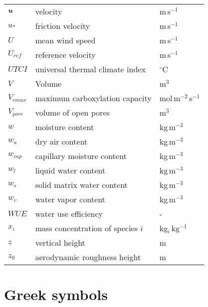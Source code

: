 \begin{longtable}{p{}p{}p{}}
	$\textbf{\textit{u}}$ & velocity & m\,s$^{-1}$ \\ 
	$u_*$ & friction velocity & m\,s$^{-1}$ \\ 
	$U$ & mean wind speed & m\,s$^{-1}$ \\ 
	$U_{\textit{ref}}$ & reference velocity & m\,s$^{-1}$ \\ 	
	$\textit{UTCI}$ & universal thermal climate index & $^{\circ}$C \\ 	

	$V$ & Volume & m$^{3}$ \\ 
	$V_{\textit{cmax}}$ & maximum carboxylation capacity & mol\,m$^{-2}$\,s$^{-1}$ \\ 
	$V_{\textit{pore}}$ & volume of open pores & m$^{3}$ \\ 
	$w$ & moisture content & kg\,m$^{-3}$ \\ 
	$w_a$ & dry air content & kg\,m$^{-3}$ \\ 	

	$w_{\textit{cap}}$ & capillary moisture content & kg\,m$^{-3}$ \\ 
	$w_l$ & liquid water content & kg\,m$^{-3}$ \\ 		
	$w_s$ & solid matrix water content & kg\,m$^{-3}$ \\ 
	$w_v$ & water vapor content & kg\,m$^{-3}$ \\ 		
	$\textit{WUE}$ & water use efficiency & - \\ 			
	$x_i$ & mass concentration of species $i$ & kg$_i$\,kg$^{-1}$ \\ 	
	$z$ & vertical height & m \\ 	
	$z_0$ & aerodynamic roughness height & m \\ 		
\end{longtable}
\vfill
\bigskip
\section*{Greek symbols}


